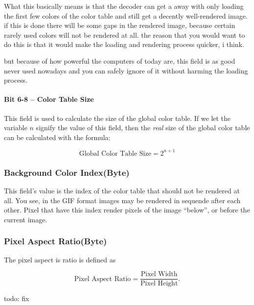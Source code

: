 \begin{refsection}
  What this basically means is that the decoder can get a away with
  only loading the first few colors of the color table and still get a
  decently well-rendered image. if this is done there will be some
  gaps in the rendered image, because certain rarely used colors will
  not be rendered at all. the reason that you would want to do this is
  that it would make the loading and rendering process quicker, i
  think.

  but because of how powerful the computers of today are, this field
  is as good never used nowadays and you can safely ignore of it
  without harming the loading process.

  \paragraph{Bit 6-8 -- Color Table Size}

  This field is used to calculate the size of the global color
  table. If we let the variable $n$ signify the value of this field,
  then the \textit{real} size of the global color table can be
  calculated with the formula:

  \begin{equation}
    \label{eq:calc-global-color-table-size}
    \textrm{Global Color Table Size} = 2^{n + 1}
  \end{equation}

  \subsubsection{Background Color Index(Byte)}

  This field's value is the index of the color table that should not
  be rendered at all. You see, in the GIF format images may be
  rendered in sequende after each other. Pixel that have this index
  render pixels of the image ``below'', or before the current image.


  \subsubsection{Pixel Aspect Ratio(Byte)}

  The pixel aspect is ratio is defined as

  \begin{equation*}
    \textrm{Pixel Aspect Ratio} = \frac{\text{Pixel Width}}{\text{Pixel Height}}.
  \end{equation*}

  todo: fix


\end{refsection}
